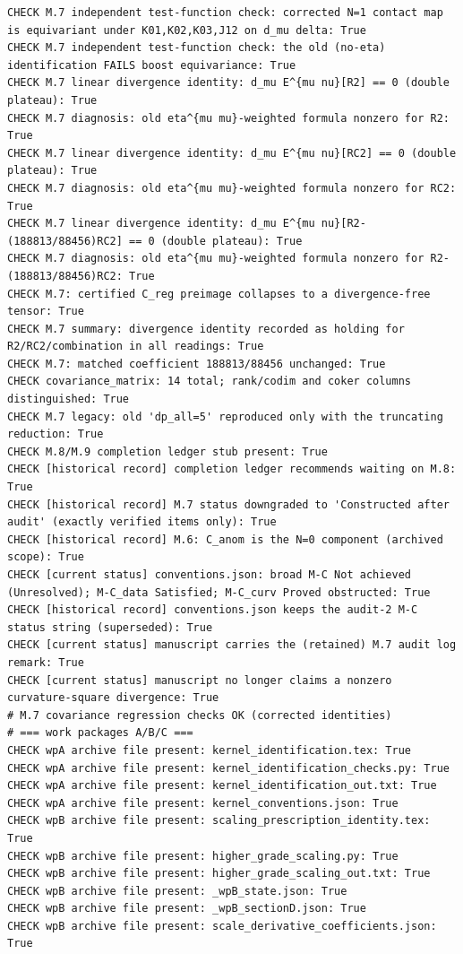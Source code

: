 \documentclass{article}
\theoremstyle{remark}
\begin{document}
\begin{lstlisting}
CHECK M.7 independent test-function check: corrected N=1 contact map is equivariant under K01,K02,K03,J12 on d_mu delta: True
CHECK M.7 independent test-function check: the old (no-eta) identification FAILS boost equivariance: True
CHECK M.7 linear divergence identity: d_mu E^{mu nu}[R2] == 0 (double plateau): True
CHECK M.7 diagnosis: old eta^{mu mu}-weighted formula nonzero for R2: True
CHECK M.7 linear divergence identity: d_mu E^{mu nu}[RC2] == 0 (double plateau): True
CHECK M.7 diagnosis: old eta^{mu mu}-weighted formula nonzero for RC2: True
CHECK M.7 linear divergence identity: d_mu E^{mu nu}[R2-(188813/88456)RC2] == 0 (double plateau): True
CHECK M.7 diagnosis: old eta^{mu mu}-weighted formula nonzero for R2-(188813/88456)RC2: True
CHECK M.7: certified C_reg preimage collapses to a divergence-free tensor: True
CHECK M.7 summary: divergence identity recorded as holding for R2/RC2/combination in all readings: True
CHECK M.7: matched coefficient 188813/88456 unchanged: True
CHECK covariance_matrix: 14 total; rank/codim and coker columns distinguished: True
CHECK M.7 legacy: old 'dp_all=5' reproduced only with the truncating reduction: True
CHECK M.8/M.9 completion ledger stub present: True
CHECK [historical record] completion ledger recommends waiting on M.8: True
CHECK [historical record] M.7 status downgraded to 'Constructed after audit' (exactly verified items only): True
CHECK [historical record] M.6: C_anom is the N=0 component (archived scope): True
CHECK [current status] conventions.json: broad M-C Not achieved (Unresolved); M-C_data Satisfied; M-C_curv Proved obstructed: True
CHECK [historical record] conventions.json keeps the audit-2 M-C status string (superseded): True
CHECK [current status] manuscript carries the (retained) M.7 audit log remark: True
CHECK [current status] manuscript no longer claims a nonzero curvature-square divergence: True
# M.7 covariance regression checks OK (corrected identities)
# === work packages A/B/C ===
CHECK wpA archive file present: kernel_identification.tex: True
CHECK wpA archive file present: kernel_identification_checks.py: True
CHECK wpA archive file present: kernel_identification_out.txt: True
CHECK wpA archive file present: kernel_conventions.json: True
CHECK wpB archive file present: scaling_prescription_identity.tex: True
CHECK wpB archive file present: higher_grade_scaling.py: True
CHECK wpB archive file present: higher_grade_scaling_out.txt: True
CHECK wpB archive file present: _wpB_state.json: True
CHECK wpB archive file present: _wpB_sectionD.json: True
CHECK wpB archive file present: scale_derivative_coefficients.json: True

\end{lstlisting}
\end{document}
